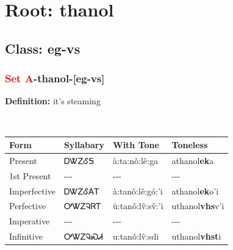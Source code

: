 \needspace{4in}
\section*{Root: thanol}
\nopagebreak
{}
\needspace{3in}
\subsection*{Class: eg-vs}
\nopagebreak
\needspace{2in}
\subsubsection*{\textcolor{Red}{Set A}{-}\textbf{thanol}{-}[eg-vs]}
\nopagebreak
\textbf{Definition: } it{\textquoteright}s steaming
\\[0.5em]
\begin{tabularx}{\textwidth}{l X X X}%
\toprule%
\textbf{Form}&\textbf{Syllabary}&\textbf{With Tone}&\textbf{Toneless}\\%
\midrule%
Present&ᎠᏔᏃᎴᎦ&à:ta:nǒ:lê:ga&athanol\textbf{ek}a\\%
1st Present&{-}{-}{-}&{-}{-}{-}&{-}{-}{-}\\%
Imperfective&ᎠᏔᏃᎴᎪᎢ&à:tanǒ:lê:gó:’i&athanol\textbf{ek}o'i\\%
Perfective&ᎤᏔᏃᎸᏒᎢ&ù:tanǒ:lv̂:sv̌:’i&uthanol\textbf{vhs}v'i\\%
Imperative&{-}{-}{-}&{-}{-}{-}&{-}{-}{-}\\%
Infinitive&ᎤᏔᏃᎸᏍᏗ&u:tanǒ:lv̂:sdi&uthanol\textbf{vhst}i\\%
\bottomrule%
\end{tabularx}
\\[1em]